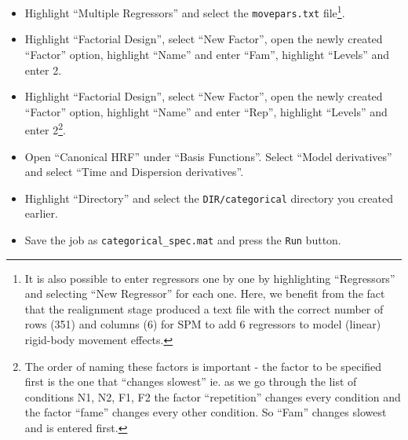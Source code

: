 \begin{itemize}
\item Highlight ``Multiple Regressors'' and select the \texttt{movepars.txt} file\footnote{It is also possible to enter regressors one by one by highlighting ``Regressors'' and selecting ``New Regressor'' for each one. Here, we benefit from the fact that the realignment stage produced a text file with the correct number of rows (351) and columns (6) for SPM to add 6 regressors to model (linear) rigid-body movement effects.}.
\item Highlight ``Factorial Design'', select ``New Factor'', open the newly created ``Factor'' option, highlight ``Name'' and enter ``Fam'', highlight ``Levels'' and enter 2.
\item Highlight ``Factorial Design'', select ``New Factor'', open the newly created ``Factor'' option, highlight ``Name'' and enter ``Rep'', highlight ``Levels'' and enter 2\footnote{The order of naming these factors is important - the factor to be specified first is the one that ``changes slowest'' ie. as we go through the list of conditions N1, N2, F1, F2 the factor ``repetition'' changes every condition and the factor ``fame'' changes every other condition. So ``Fam'' changes slowest and is entered first.}.
\item Open ``Canonical HRF'' under ``Basis Functions''. Select ``Model derivatives'' and select ``Time and Dispersion derivatives''.
\item Highlight ``Directory'' and select the \texttt{DIR/categorical} directory you created earlier.
\item Save the job as \texttt{categorical\_spec.mat} and press the \texttt{Run} button.
\end{itemize}


